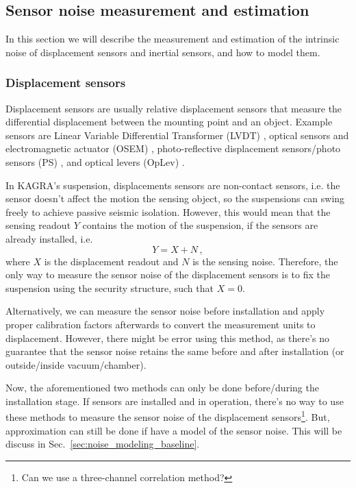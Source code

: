 \subsection{Sensor noise measurement and estimation \label{sec:sensor_noise_measurement}}
In this section we will describe the measurement and estimation of the intrinsic noise of displacement sensors and inertial sensors, and how to model them.

\subsubsection{Displacement sensors \label{sec:displacement_sensors_baseline}}
Displacement sensors are usually relative displacement sensors that measure the differential displacement between the mounting point and an object.
Example sensors are Linear Variable Differential Transformer (LVDT) \cite{Akutsu:2021auw}, optical sensors and electromagnetic actuator (OSEM) \cite{Akutsu:2020efg, use_of_osems}, photo-reflective displacement sensors/photo sensors (PS) \cite{Akutsu:2020wgy}, and optical levers (OpLev) \cite{sensing_matrices_oplev, length_sensing_oplev, optical_lever_for_kagra}.

In KAGRA's suspension, displacements sensors are non-contact sensors, i.e. the sensor doesn't affect the motion the sensing object, so the suspensions can swing freely to achieve passive seismic isolation.
However, this would mean that the sensing readout $Y$ contains the motion of the suspension, if the sensors are already installed, i.e.
\begin{equation}
	Y=X+N\,,
	\label{eqn:displacement_sensing_readout}
\end{equation}
where $X$ is the displacement readout and $N$ is the sensing noise.
Therefore, the only way to measure the sensor noise of the displacement sensors is to fix the suspension using the security structure, such that $X=0$.

Alternatively, we can measure the sensor noise before installation and apply proper calibration factors afterwards to convert the measurement units to displacement.
However, there might be error using this method, as there's no guarantee that the sensor noise retains the same before and after installation (or outside/inside vacuum/chamber).

Now, the aforementioned two methods can only be done before/during the installation stage.
If sensors are installed and in operation, there's no way to use these methods to measure the sensor noise of the displacement sensors\footnote{Can we use a three-channel correlation method?}.
But, approximation can still be done if have a model of the sensor noise.
This will be discuss in Sec.~\ref{sec:noise_modeling_baseline}.

